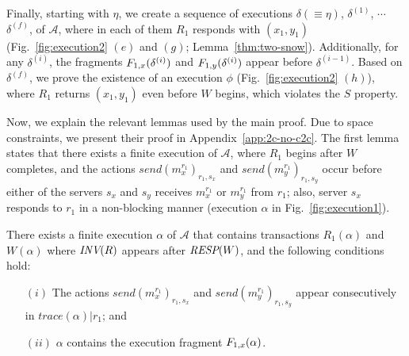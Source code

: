     Finally, starting with  $\eta$, we create a sequence of executions $\delta (\equiv \eta)$, $\delta^{(1)}$, $\cdots$ $\delta^{(f)}$, of $\mathcal{A}$, 
     where in each of them $R_1$ responds with $(x_1, y_1)$  (Fig.~\ref{fig:execution2} $(e)$ and $(g)$; Lemma~\ref{thm:two-snow}). Additionally,  for any $\delta^{(i)}$, the fragments   ${ F_{1,x}(\delta^{(i)})}$ and
    ${ F_{1,y}(\delta^{(i)})}$  appear before $\delta^{(i-1)}$.
    Based on $\delta^{(f)}$, we prove the existence of an execution $\phi$ (Fig.~\ref{fig:execution2} $(h)$), where $R_1$ returns 
    $(x_1, y_1)$ even before $W$ begins, which violates the $S$ property.


  
  Now, we explain the relevant lemmas used by the main proof. Due to space constraints, we present their proof in Appendix~\ref{app:2c-no-c2c}. The first lemma states that there exists a finite execution of ${\mathcal A}$, where $R_1$ begins after  
  $W$ completes, and the actions $send(m_x^{r_1})_{r_1, s_x}$ and $send(m_y^{r_1})_{r_1, s_y}$  occur 
before either of the servers $s_x$ and  $s_y$ 
  receives $m_x^{r_1}$ or $m_y^{r_1}$ from $r_1$;  also,  server $s_x$ responds to $r_1$ in a non-blocking manner (execution $\alpha$ in Fig.~\ref{fig:execution1}).  
\begin{lemma}\label{lem:exec_alpha} 
There exists a finite execution $\alpha$ of $\mathcal{A}$ that contains transactions $R_1(\alpha)$  
 and $W(\alpha)$ where ${\textit{INV}(R)}$ appears after ${\textit{RESP}(W)}$, and the following conditions hold:
\begin{enumerate}
\item[$(i)$] The actions $send(m_x^{r_1})_{r_1, s_x}$ and  $send(m_y^{r_1})_{r_1, s_y}$ appear consecutively in $trace(\alpha)|r_1$; and 
\item[$(ii)$]   $\alpha$ contains the execution fragment  ${ F_{1,x}(\alpha)}$.
\end{enumerate} 
\end{lemma}

